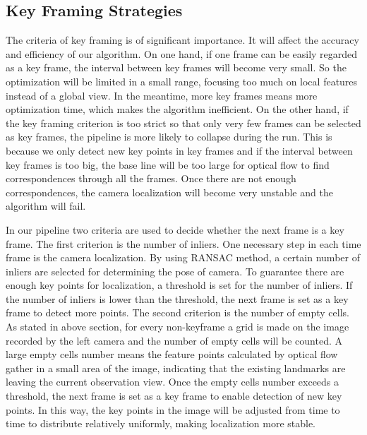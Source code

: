\documentclass{easychair}
\begin{document}
\subsection{Key Framing Strategies}
The criteria of key framing is of significant importance. It will affect the accuracy and efficiency of our algorithm. On one hand, if one frame can be easily regarded as a key frame, the interval between key frames will become very small. So the optimization will be limited in a small range, focusing too much on local features instead of a global view. In the meantime, more key frames means more optimization time, which makes the algorithm inefficient. On the other hand, if the key framing criterion is too strict so that only very few frames can be selected as key frames, the pipeline is more likely to collapse during the run. This is because we only detect new key points in key frames and if the interval between key frames is too big, the base line will be too large for optical flow to find correspondences through all the frames. Once there are not enough correspondences, the camera localization will become very unstable and the algorithm will fail.

In our pipeline two criteria are used to decide whether the next frame is a key frame. The first criterion is the number of inliers. One necessary step in each time frame is the camera localization. By using RANSAC method, a certain number of inliers are selected for determining the pose of camera. To guarantee there are enough key points for localization, a threshold is set for the number of inliers. If the number of inliers is lower than the threshold, the next frame is set as a key frame to detect more points. The second criterion is the number of empty cells. As stated in above section, for every non-keyframe a grid is made on the image recorded by the left camera and the number of empty cells will be counted. A large empty cells number means the feature points calculated by optical flow gather in a small area of the image, indicating that the existing landmarks are leaving the current observation view. Once the empty cells number exceeds a threshold, the next frame is set as a key frame to enable detection of new key points. In this way, the key points in the image will be adjusted from time to time to distribute relatively uniformly, making localization more stable.
\end{document}
